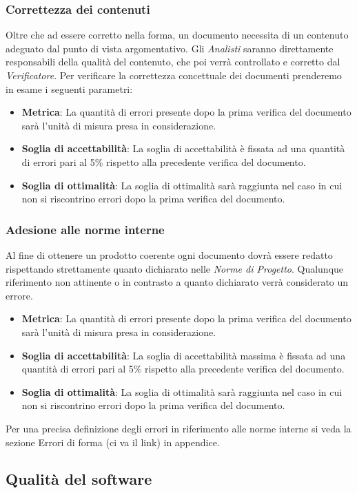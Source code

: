 \subsubsection{Correttezza dei contenuti}
Oltre che ad essere corretto nella forma, un documento necessita di un contenuto adeguato dal punto di vista argomentativo. Gli \emph{Analisti} saranno direttamente responsabili della qualità del contenuto, che poi verrà controllato e corretto dal \emph{Verificatore}.
Per verificare la correttezza concettuale dei documenti prenderemo in esame i seguenti parametri:
\begin{itemize}
	\item \textbf{Metrica}: La quantità di errori presente dopo la prima verifica del documento sarà l'unità di misura presa in considerazione.
	\item \textbf{Soglia di accettabilità}: La soglia di accettabilità è fissata ad una quantità di errori pari al 5\% rispetto alla precedente verifica del documento.
	\item \textbf{Soglia di ottimalità}: La soglia di ottimalità sarà raggiunta nel caso in cui non si riscontrino errori dopo la prima verifica del documento.
\end{itemize}
\subsubsection{Adesione alle norme interne}
Al fine di ottenere un prodotto coerente ogni documento dovrà essere redatto rispettando strettamente quanto dichiarato nelle \emph{Norme di Progetto}.
Qualunque riferimento non attinente o in contrasto a quanto dichiarato verrà considerato un errore.
\begin{itemize}
	\item \textbf{Metrica}: La quantità di errori presente dopo la prima verifica del documento sarà l'unità di misura presa in considerazione. 
	\item \textbf{Soglia di accettabilità}: La soglia di accettabilità massima è fissata ad una quantità di errori pari al 5\% rispetto alla precedente verifica del documento.
	\item \textbf{Soglia di ottimalità}: La soglia di ottimalità sarà raggiunta nel caso in cui non si riscontrino errori dopo la prima verifica del documento.
\end{itemize}
Per una precisa definizione degli errori in riferimento alle norme interne si veda la sezione Errori di forma (ci va il link) in appendice.
\subsection{Qualità del software}